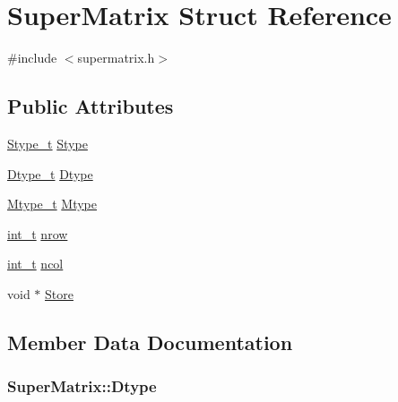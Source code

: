 \hypertarget{structSuperMatrix}{}\section{Super\+Matrix Struct Reference}
\label{structSuperMatrix}


{\ttfamily \#include $<$supermatrix.\+h$>$}

\subsection*{Public Attributes}
\begin{DoxyCompactItemize}
\item 
\hyperlink{supermatrix_8h_a9d2ddedeb2a3d92e950811c61d0b8796}{Stype\+\_\+t} \hyperlink{structSuperMatrix_ab37e181824f50a405272451afc399952}{Stype}
\item 
\hyperlink{supermatrix_8h_a7987cb2a28ec879b39a90e9e48e29190}{Dtype\+\_\+t} \hyperlink{structSuperMatrix_aedd4bd451819549620b49076a62dfdcc}{Dtype}
\item 
\hyperlink{supermatrix_8h_a5962adac634f3feebe487ad443802d60}{Mtype\+\_\+t} \hyperlink{structSuperMatrix_a42877db0cfad1033374474f48e4b3fc4}{Mtype}
\item 
\hyperlink{slu__cdefs_8h_ab6fd6105e64ed14a0c9281326f05e623}{int\+\_\+t} \hyperlink{structSuperMatrix_ab1d854b814f0757e7ff7e0da01c6ef43}{nrow}
\item 
\hyperlink{slu__cdefs_8h_ab6fd6105e64ed14a0c9281326f05e623}{int\+\_\+t} \hyperlink{structSuperMatrix_ab8b85bf206c36ebc2223cc2ec6acbe8c}{ncol}
\item 
void $\ast$ \hyperlink{structSuperMatrix_a73ebca1b46bb24536226b9378e01c5b5}{Store}
\end{DoxyCompactItemize}


\subsection{Member Data Documentation}
\hypertarget{structSuperMatrix_aedd4bd451819549620b49076a62dfdcc}{}
\subsubsection[{Dtype}]{ Super\+Matrix\+::\+Dtype}\label{structSuperMatrix_aedd4bd451819549620b49076a62dfdcc}
\hypertarget{structSuperMatrix_a42877db0cfad1033374474f48e4b3fc4}{}

